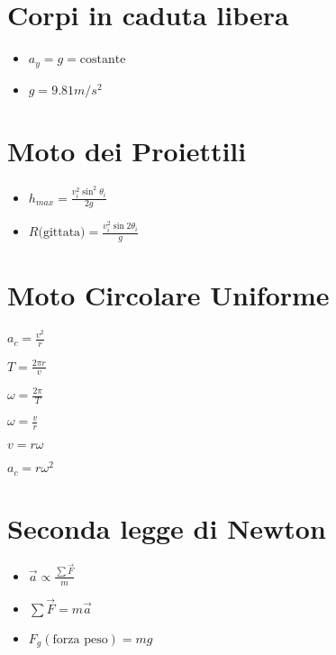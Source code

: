 \documentclass[a4paper,12pt,landscape]{article}
\begin{document}
\begin{multicols*}{2}
    \section*{Corpi in caduta libera}
    \begin{itemize}
        \item $a_y = g = \text{costante}$
        \item $g = 9.81 m/s^2$
    \end{itemize}

    \section*{Moto dei Proiettili}
    \begin{itemize}
        \item $h_{max} = \frac{v_i^2 \sin^2 \theta_i}{2g}$
        \item $R \text{(gittata)} = \frac{v_i^2 \sin 2\theta_i}{g}$
    \end{itemize}

    \section*{Moto Circolare Uniforme}
    \begin{itemize}
        \begin{multicols*}{2}
            \item $a_c = \frac{v^2}{r}$
            \item $T = \frac{2 \pi r}{v}$
            \item $\omega = \frac{2\pi}{T}$
            \item $\omega = \frac{v}{r}$
            \item $v = r\omega$
            \item $a_c = r\omega^2$ 
        \end{multicols*}
    \end{itemize}
    
    \section*{Seconda legge di Newton}
    \begin{itemize}
        \item $\vec{a} \propto \frac{\sum \vec{F}}{m}$
        \item $\sum \vec{F} = m\vec{a}$
        \item $F_g (\text{forza peso}) = mg$
    \end{itemize}


\end{multicols*}
\end{document}
